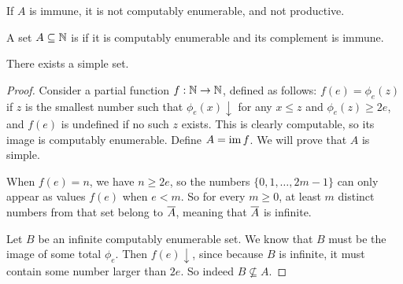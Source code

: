 \begin{remark}
  If $A$ is immune, it is not computably enumerable, and not productive.
\end{remark}

\begin{definition}
  A set $A \subseteq \mathbb{N}$ is  if it is computably enumerable and
  its complement is immune.
\end{definition}

\begin{theorem}[Post]
  There exists a simple set.
\end{theorem}

\begin{proof}
  Consider a partial function $f: \mathbb{N} \to \mathbb{N}$, defined as follows:
  $f(e) = \phi_e(z)$ if $z$ is the smallest number such that $\phi_e(x)
  \downarrow$ for any $x \le z$ and $\phi_e(z) \ge 2e$, and $f(e)$ is undefined
  if no such $z$ exists.
  This is clearly computable, so its image is computably enumerable.
  Define $A = \operatorname{im} f$.
  We will prove that $A$ is simple.

  When $f(e) = n$, we have $n \ge 2e$, so the numbers $\{0, 1, \ldots, 2m-1\}$
  can only appear as values $f(e)$ when $e < m$.
  So for every $m \ge 0$, at least $m$ distinct numbers from that set belong to
  $\overline{A}$, meaning that $\overline{A}$ is infinite.

  Let $B$ be an infinite computably enumerable set.
  We know that $B$ must be the image of some total $\phi_e$.
  Then $f(e) \downarrow$, since because $B$ is infinite, it must contain some
  number larger than $2e$.
  So indeed $B \nsubseteq A$.
\end{proof}

